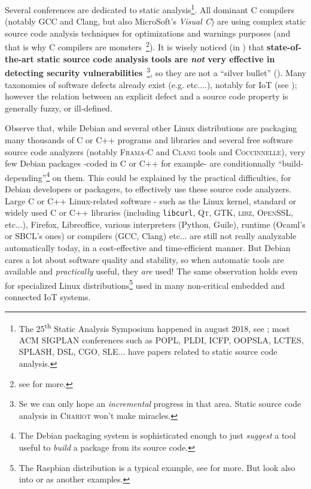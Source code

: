 Several conferences are dedicated to static analysis\footnote{The
  25\textsuperscript{th} Static Analysis Symposium happened in
  august 2018, see
  ; most ACM
  SIGPLAN conferences such as POPL, PLDI, ICFP, OOPSLA, LCTES, SPLASH,
  DSL, CGO, SLE... have papers related to static source code
  analysis.}.  All dominant C compilers (notably GCC and Clang, but
also MicroSoft's \emph{Visual C}\texttrademark) are using complex
static source code analysis techniques for optimizations and warnings
purposes (and that is why C compilers are monsters~\footnote{see
  for more.}). It is wisely noticed (in
\cite{GosevaPopstojanova2015OnTC}) that \textbf{state-of-the-art
  static source code analysis tools are \emph{not} very effective in
  detecting  security
  vulnerabilities}~\footnote{Se we can only hope an \emph{incremental}
  progress in that area. Static source code analysis in
  \textsc{Chariot} won't make miracles.}, so they are not a ``silver
bullet''  (\cite{Brooks:1987:NSB}). Many
taxonomies of software defects  already exist
(e.g. \cite{Silva:2016:SES, Wagner:2008:DCD, Levine:2009:DDE}
etc....), notably for IoT (see \cite{Carpent:2018:RRA,
  Ahmad:2018:ModelBasedIoT, Laszlo:2017:Vessedia}); however the
relation between an explicit defect and a source code property is
generally fuzzy, or ill-defined.

Observe that, while Debian and several other Linux distributions are
packaging many thousands of C or C++ programs and libraries and
several free software source code analyzers (notably \textsc{Frama-C}
and \textsc{Clang} tools and \textsc{Coccinnelle}), very few Debian
packages -coded in C or C++ for example- are conditionnally
``build-depending''\footnote{The Debian packaging system is
  sophisticated enough to just \emph{suggest} a tool useful to
  \emph{build} a package from its source code.} on them. This could be
explained by the practical difficulties, for Debian developers or
packagers, to effectively use these source code analyzers. Large C or
C++ Linux-related software - such as the Linux kernel, standard or
widely used C or C++ libraries (including \texttt{libcurl},
\textsc{Qt}, \textsc{GTK}, \textsc{libz}, \textsc{OpenSSL}, etc...),
Firefox, Libreoffice, various interpreters (Python, Guile), runtime
(Ocaml's or SBCL's ones) or compilers (GCC, Clang) etc... are still
not really analyzable automatically today, in a cost-effective and
time-efficient manner. But Debian cares a lot about software quality
and stability, so when automatic tools are available and
\emph{practically} useful, they \emph{are} used! The same observation
holds even for specialized Linux distributions\footnote{The Raspbian
  distribution is a typical example, see 
  for more. But look also into
   or
   as another examples.} used in many
non-critical embedded and connected IoT systems.


